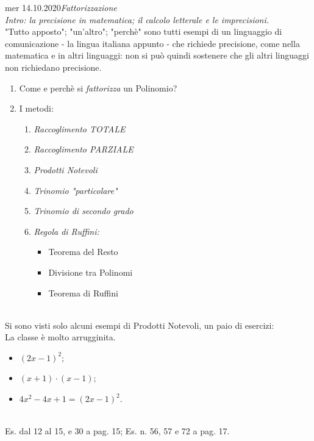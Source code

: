 \documentclass[10pt, a4paper twoside, notitlepage, notoc, justified]{tufte-handout}
\begin{document}
\begin{loggentry}{mer 14.10.2020}{\em Fattorizzazione}\\
{\em Intro: la precisione in matematica; il calcolo letterale e le imprecisioni.}\\
"Tutto apposto"; "un'altro"; "perchè" sono tutti esempi di un linguaggio di comunicazione - la lingua italiana appunto - che richiede precisione, come nella matematica e in altri linguaggi: non si può quindi sostenere che gli altri linguaggi non richiedano precisione. 
\begin{enumerate}
			\item Come e perchè si {\em fattorizza} un Polinomio? 
			\item I metodi:
			\begin{enumerate}
				\item {\em Raccoglimento TOTALE}
				\item {\em Raccoglimento PARZIALE}
				\item {\em Prodotti Notevoli}
				\item {\em Trinomio "particolare"}
				\item {\em Trinomio di secondo grado}
				\item {\em Regola di Ruffini:}
				\begin{itemize}
					\item Teorema del Resto
					\item Divisione tra Polinomi
					\item Teorema di Ruffini
				\end{itemize}
			\end{enumerate}
		\end{enumerate}
\end{loggentry}

\\ Si sono visti solo alcuni esempi di Prodotti Notevoli, un paio di esercizi:\\ La classe è molto arrugginita.
\begin{itemize}
	\item $(2x-1)^2$;
	\item $(x+1) \cdot (x-1)$;
	\item $4x^2-4x+1 = (2x-1)^2$.
\end{itemize}

\\ Es. dal 12 al 15, e 30 a pag. 15; Es. n. 56, 57 e 72 a pag. 17.\\
\end{document}
